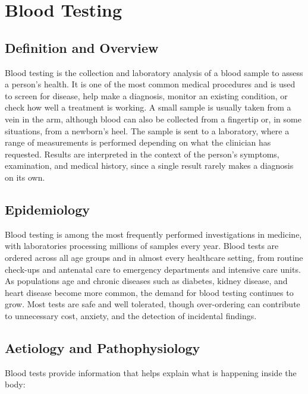 \chapter{Blood Testing}

\section*{Definition and Overview}
Blood testing is the collection and laboratory analysis of a blood sample to assess a person's health. It is one of the most common medical procedures and is used to screen for disease, help make a diagnosis, monitor an existing condition, or check how well a treatment is working. A small sample is usually taken from a vein in the arm, although blood can also be collected from a fingertip or, in some situations, from a newborn's heel. The sample is sent to a laboratory, where a range of measurements is performed depending on what the clinician has requested. Results are interpreted in the context of the person's symptoms, examination, and medical history, since a single result rarely makes a diagnosis on its own.

\section*{Epidemiology}
Blood testing is among the most frequently performed investigations in medicine, with laboratories processing millions of samples every year. Blood tests are ordered across all age groups and in almost every healthcare setting, from routine check-ups and antenatal care to emergency departments and intensive care units. As populations age and chronic diseases such as diabetes, kidney disease, and heart disease become more common, the demand for blood testing continues to grow. Most tests are safe and well tolerated, though over-ordering can contribute to unnecessary cost, anxiety, and the detection of incidental findings.

\section*{Aetiology and Pathophysiology}
Blood tests provide information that helps explain what is happening inside the body:

